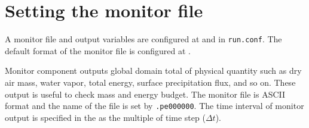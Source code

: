 \section{Setting the monitor file} \label{sec:monitor}

A monitor file and output variables are configured at  and  in \verb|run.conf|.
The default format of the monitor file is configured at .


Monitor component outputs global domain total of physical quantity such as dry air mass, water vapor, total energy, surface precipitation flux, and so on.
These output is useful to check mass and energy budget.
The monitor file is ASCII format and the name of the file is set by  \verb|.pe000000|.
The time interval of monitor output is specified in the  as the multiple of time step ($\Delta t$).


